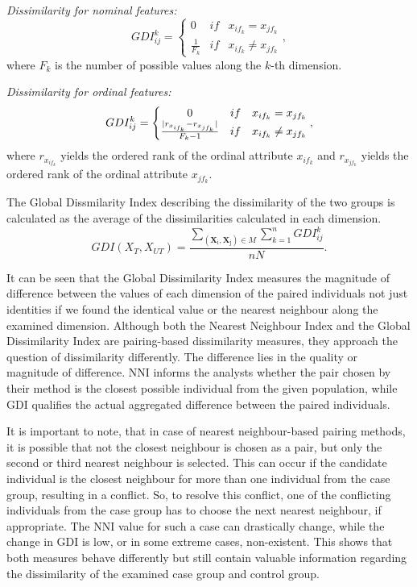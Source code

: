 \vspace{0.3cm}
\noindent\emph{Dissimilarity for nominal features:}
\begin{equation}
	GDI_{ij}^k=\left\{\begin{matrix}
	0 & if & x_{if_k}=x_{jf_k}\\ 
	\frac{1}{F_k} & if & x_{if_k} \neq x_{jf_k} 
	\end{matrix}\right.\label{eq:ddi_nom},
\end{equation}
where $F_k$ is the number of possible values along the $k$-th dimension.

\vspace{0.3cm}
\noindent\emph{Dissimilarity for ordinal features:}
\begin{equation}
	GDI_{ij}^k=\left\{\begin{matrix}
	0 & if & x_{if_k}=x_{jf_k}\\ 
	\frac{\lvert r_{x_{if_k}}-r_{x_{jf_k}}\rvert}{F_k-1} & if & x_{if_k} \neq x_{jf_k} 
	\end{matrix}\right.\label{eq:ddi_ord},
\end{equation}
where $r_{x_{if_k}}$ yields the ordered rank of the ordinal attribute $x_{if_k}$ and $r_{x_{jf_k}}$ yields the ordered rank of the ordinal attribute $x_{jf_k}$.

The Global Dissmilarity Index describing the dissimilarity of the two groups is calculated as the average of the dissimilarities calculated in each dimension.
\begin{equation}
	GDI(X_T,X_{UT})=\frac{\sum_{(\bm{\mathrm{\textbf{X}_i}}, \bm{\mathrm{\textbf{X}_j}})\in M}\sum_{k=1}^nGDI_{ij}^k}{nN}.
	\label{eq:f_ddi}
\end{equation}

It can be seen that the Global Dissimilarity Index measures the magnitude of difference between the values of each dimension of the paired individuals not just identities if we found the identical value or the nearest neighbour along the examined dimension. Although both the Nearest Neighbour Index and the Global Dissimilarity Index are pairing-based dissimilarity measures, they approach the question of dissimilarity differently. The difference lies in the quality or magnitude of difference. NNI informs the analysts whether the pair chosen by their method is the closest possible individual from the given population, while GDI qualifies the actual aggregated difference between the paired individuals.

It is important to note, that in case of nearest neighbour-based pairing methods, it is possible that not the closest neighbour is chosen as a pair, but only the second or third nearest neighbour is selected. This can occur if the candidate individual is the closest neighbour for more than one individual from the case group, resulting in a conflict. So, to resolve this conflict, one of the conflicting individuals from the case group has to choose the next nearest neighbour, if appropriate. The NNI value for such a case can drastically change, while the change in GDI is low, or in some extreme cases, non-existent. This shows that both measures behave differently but still contain valuable information regarding the dissimilarity of the examined case group and control group.

